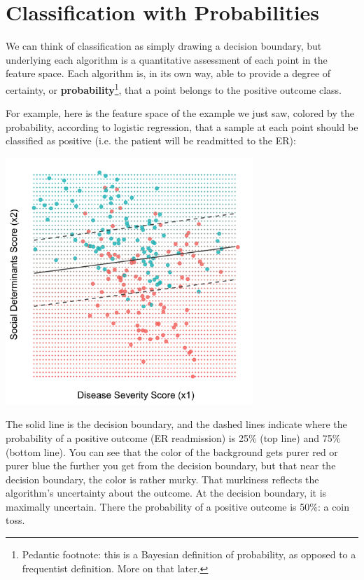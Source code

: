 
\section{Classification with Probabilities}

We can think of classification as simply drawing a decision boundary, but underlying each algorithm is a quantitative assessment of each point in the feature space. Each algorithm is, in its own way, able to provide a degree of certainty, or \textbf{probability}\footnote{Pedantic footnote: this is a Bayesian definition of probability, as opposed to a frequentist definition. More on that later.}, that a point belongs to the positive outcome class. 

For example, here is the feature space of the example we just saw, colored by the probability, according to logistic regression, that a sample at each point should be classified as positive (i.e. the patient will be readmitted to the ER): 
\begin{center}
\includegraphics[width=0.7\textwidth]{img/esl-logistic-prob.png}
\end{center}

The solid line is the decision boundary, and the dashed lines indicate where the probability of a positive outcome (ER readmission) is 25\% (top line) and 75\% (bottom line). You can see that the color of the background gets purer red or purer blue the further you get from the decision boundary, but that near the decision boundary, the color is rather murky. That murkiness reflects the algorithm's uncertainty about the outcome. At the decision boundary, it is maximally uncertain. There the probability of a positive outcome is 50\%: a coin toss. 

